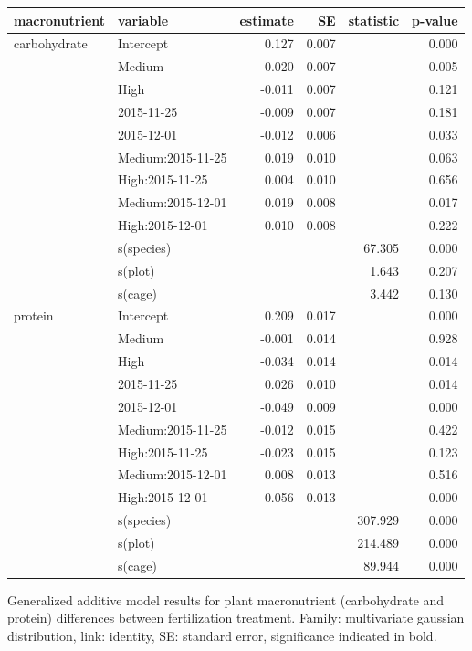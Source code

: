 \documentclass[
]{article}
\begin{document}
\begin{tbl}

\begin{minipage}{\linewidth}

\begingroup
\fontsize{12.0pt}{14.4pt}\selectfont
\begin{longtable*}{llrrrr}
\toprule
macronutrient & variable & estimate & SE & statistic & p-value \\ 
\midrule\addlinespace[2.5pt]
carbohydrate & Intercept & 0.127 & 0.007 &  & 0.000 \\ 
 & Medium & -0.020 & 0.007 &  & 0.005 \\ 
 & High & -0.011 & 0.007 &  & 0.121 \\ 
 & 2015-11-25 & -0.009 & 0.007 &  & 0.181 \\ 
 & 2015-12-01 & -0.012 & 0.006 &  & 0.033 \\ 
 & Medium:2015-11-25 & 0.019 & 0.010 &  & 0.063 \\ 
 & High:2015-11-25 & 0.004 & 0.010 &  & 0.656 \\ 
 & Medium:2015-12-01 & 0.019 & 0.008 &  & 0.017 \\ 
 & High:2015-12-01 & 0.010 & 0.008 &  & 0.222 \\ 
 & s(species) &  &  & 67.305 & 0.000 \\ 
 & s(plot) &  &  & 1.643 & 0.207 \\ 
 & s(cage) &  &  & 3.442 & 0.130 \\ 
protein & Intercept & 0.209 & 0.017 &  & 0.000 \\ 
 & Medium & -0.001 & 0.014 &  & 0.928 \\ 
 & High & -0.034 & 0.014 &  & 0.014 \\ 
 & 2015-11-25 & 0.026 & 0.010 &  & 0.014 \\ 
 & 2015-12-01 & -0.049 & 0.009 &  & 0.000 \\ 
 & Medium:2015-11-25 & -0.012 & 0.015 &  & 0.422 \\ 
 & High:2015-11-25 & -0.023 & 0.015 &  & 0.123 \\ 
 & Medium:2015-12-01 & 0.008 & 0.013 &  & 0.516 \\ 
 & High:2015-12-01 & 0.056 & 0.013 &  & 0.000 \\ 
 & s(species) &  &  & 307.929 & 0.000 \\ 
 & s(plot) &  &  & 214.489 & 0.000 \\ 
 & s(cage) &  &  & 89.944 & 0.000 \\ 
\bottomrule
\end{longtable*}
\endgroup

\end{minipage}%

\caption{\label{tbl-field-cage-plant-nutrients}Generalized additive
model results for plant macronutrient (carbohydrate and protein)
differences between fertilization treatment. Family: multivariate
gaussian distribution, link: identity, SE: standard error, significance
indicated in bold.}

\end{tbl}%
\end{document}
